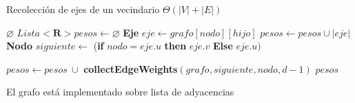 \begin{algorithm}[H]
\caption{Recolección de ejes de un vecindario \Comment $\Theta(|V| + |E|)$}
\begin{algorithmic}[1]
		\State \Return $\varnothing$
	\EndIf
	\Statex
	\State $Lista<\mathbf{R}> pesos \gets \varnothing$
		\State \textbf{Eje} $eje \gets grafo[nodo][hijo]$
		\Statex
			\State $pesos \gets pesos \cup |eje|$
			\Statex
				\State \textbf{Nodo} $siguiente \gets$ (\textbf{if} {$nodo = eje.u$} \textbf{then} $eje.v$ \textbf{Else} $eje.u)$

				\State $pesos \gets pesos \ \cup$ \textbf{collectEdgeWeights}$(grafo, siguiente, nodo, d - 1)$
			\EndIf
		\EndIf
	\EndFor
	\Statex
	\State \Return $pesos$
\EndFunction
\end{algorithmic}
\end{algorithm}

El grafo está implementado sobre lista de adyacencias